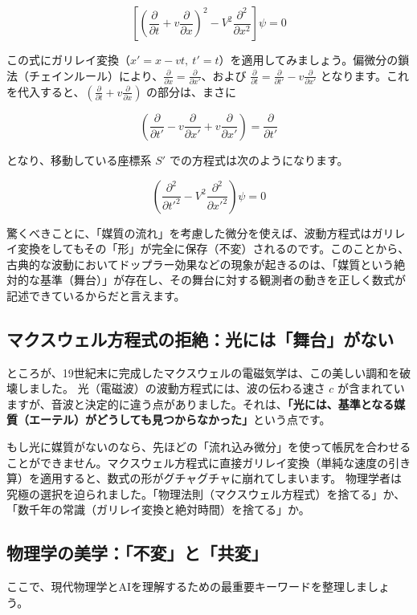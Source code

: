 \[
\left[
\left(
\frac{\partial}{\partial t}
+
v\frac{\partial}{\partial x}
\right)^2
-
V^2\frac{\partial^2}{\partial x^2}
\right]\psi=0
\]

この式にガリレイ変換（\(x' = x - vt,\ t' = t\)）を適用してみましょう。偏微分の鎖法（チェインルール）により、\(\frac{\partial}{\partial x} = \frac{\partial}{\partial x'}\)、および \(\frac{\partial}{\partial t} = \frac{\partial}{\partial t'} - v\frac{\partial}{\partial x'}\) となります。これを代入すると、\(\left(\frac{\partial}{\partial t} + v\frac{\partial}{\partial x}\right)\) の部分は、まさに

\[
\left(
\frac{\partial}{\partial t'}
-
v\frac{\partial}{\partial x'}
+
v\frac{\partial}{\partial x'}
\right)
=
\frac{\partial}{\partial t'}
\]

となり、移動している座標系 \(S'\) での方程式は次のようになります。

\[
\left(
\frac{\partial^2}{\partial t'^2}
-
V^2\frac{\partial^2}{\partial x'^2}
\right)\psi=0
\]

驚くべきことに、「媒質の流れ」を考慮した微分を使えば、波動方程式はガリレイ変換をしてもその「形」が完全に保存（不変）されるのです。このことから、古典的な波動においてドップラー効果などの現象が起きるのは、「媒質という絶対的な基準（舞台）」が存在し、その舞台に対する観測者の動きを正しく数式が記述できているからだと言えます。
\subsection{マクスウェル方程式の拒絶：光には「舞台」がない}

ところが、19世紀末に完成したマクスウェルの電磁気学は、この美しい調和を破壊しました。 光（電磁波）の波動方程式には、波の伝わる速さ \(c\) が含まれていますが、音波と決定的に違う点がありました。それは、\textbf{「光には、基準となる媒質（エーテル）がどうしても見つからなかった」}という点です。

もし光に媒質がないのなら、先ほどの「流れ込み微分」を使って帳尻を合わせることができません。マクスウェル方程式に直接ガリレイ変換（単純な速度の引き算）を適用すると、数式の形がグチャグチャに崩れてしまいます。 物理学者は究極の選択を迫られました。「物理法則（マクスウェル方程式）を捨てる」か、「数千年の常識（ガリレイ変換と絶対時間）を捨てる」か。

\subsection{物理学の美学：「不変」と「共変」}

ここで、現代物理学とAIを理解するための最重要キーワードを整理しましょう。

